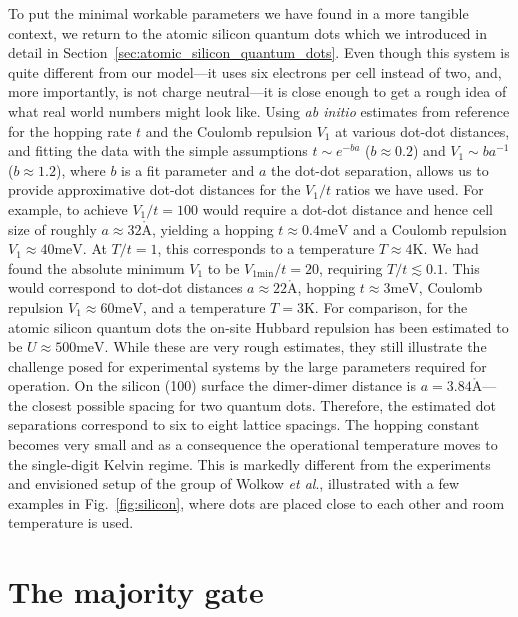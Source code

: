 To put the minimal workable parameters we have found in a more tangible context,
we return to the atomic silicon quantum dots which we introduced in detail in
Section~\ref{sec:atomic_silicon_quantum_dots}. Even though this system is quite
different from our model---it uses six electrons per cell instead of two, and,
more importantly, is not charge neutral---it is close enough to get a rough idea
of what real world numbers might look like. Using \emph{ab initio} estimates
from reference \cite{pitters2011tunnel} for the hopping rate $t$ and the Coulomb
repulsion $V_1$ at various dot-dot distances, and fitting the data with the
simple assumptions $t \sim e^{-b a}$ ($b \approx 0.2$) and $V_1 \sim b a^{-1}$
($b \approx 1.2$), where $b$ is a fit parameter and $a$ the dot-dot separation,
allows us to provide approximative dot-dot distances for the $V_1/t$ ratios we
have used. For example, to achieve $V_1/t = 100$ would require a dot-dot
distance and hence cell size of roughly $a \approx 32 \mathring{\mathrm{A}}$,
yielding a hopping $t \approx 0.4 \text{meV}$ and a Coulomb repulsion $V_1
\approx 40 \text{meV}$. At $T/t = 1$, this corresponds to a temperature $T
\approx 4 \text{K}$. We had found the absolute minimum $V_1$ to be
$V_{1\text{min}}/t = 20$, requiring $T/t \lesssim 0.1$. This would correspond
to dot-dot distances $a \approx 22 \mathring{\mathrm{A}}$, hopping $t \approx 3
\text{meV}$, Coulomb repulsion $V_1 \approx 60 \text{meV}$, and a temperature $T
= 3 \text{K}$. For comparison, for the atomic silicon quantum dots the on-site
Hubbard repulsion has been estimated to be $U \approx 500 \text{meV}$. While these
are very rough
estimates, they still illustrate the challenge posed for experimental systems by
the large parameters required for  operation. On the silicon (100)
surface the dimer-dimer distance is $a = 3.84 \mathring{\mathrm{A}}$---the
closest possible spacing for two quantum dots. Therefore, the estimated dot
separations correspond to six to eight lattice spacings. The hopping constant
becomes very small and as a consequence the operational temperature moves to the
single-digit Kelvin regime. This is markedly different from the experiments and
envisioned setup of the group of Wolkow \emph{et al}., illustrated with a few
examples in Fig.~\ref{fig:silicon}, where dots are placed close to each other
and room temperature is used.


\section{The majority gate}

